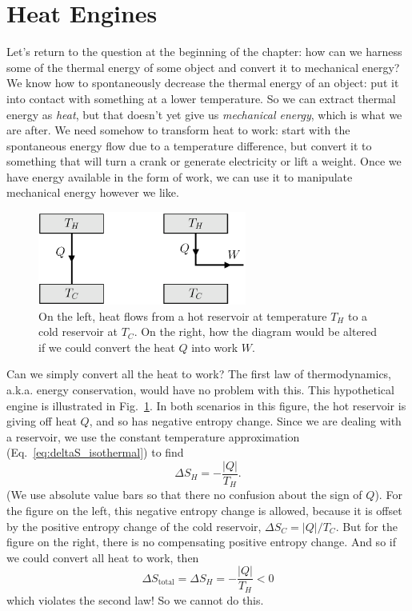 \section{Heat Engines}

Let's return to the question at the beginning of the chapter: how can
we harness some of the thermal energy of some object and convert it to
mechanical energy?  We know how to spontaneously decrease the thermal
energy of an object: put it into contact with something at a lower
temperature.  So we can extract thermal energy as {\it heat}, but that
doesn't yet give us {\it mechanical energy}, which is what we are
after.  We need somehow to transform heat to work: start with the
spontaneous energy flow due to a temperature difference, but convert
it to something that will turn a crank or generate electricity or lift
a weight.  Once we have energy available in the form of work, we can
use it to manipulate mechanical energy however we like.

\begin{figure}[t]
\begin{center}
\includegraphics[width=2.7in]{heat_engines/impossible.eps}
\caption{On the left, heat flows from a hot reservoir at temperature $T_H$
  to a cold reservoir at $T_C$.  On the right, how the diagram would
  be altered if we could convert the heat $Q$ into work $W$.}
\label{fig:impossible_engine}
\end{center}
\end{figure}

Can we simply convert all the heat to work?  The first law of
thermodynamics, a.k.a. energy conservation, would have no problem with
this.  This hypothetical engine is illustrated in
Fig.~\ref{fig:impossible_engine}.  In both scenarios in this figure,
the hot reservoir is giving off heat $Q$, and so has negative entropy
change.  Since we are dealing with a reservoir, we use the 
constant temperature approximation (Eq.~\ref{eq:deltaS_isothermal}) to find
\begin{equation}
\Delta S_H = -\frac{|Q|}{T_H}.
\end{equation}
(We use absolute value bars so that there no confusion about the sign
of $Q$).  For the figure on the left, this negative entropy change is
allowed, because it is offset by the positive entropy change of the
cold reservoir, $\Delta S_C=|Q|/T_C$.  But for the figure on the
right, there is no compensating positive entropy change.  And so if we
could convert all heat to work, then
\begin{equation}
\Delta S_\text{total} = \Delta S_H = -\frac{|Q|}{T_H} < 0
\end{equation}
which violates the second law!  So we cannot do this.

